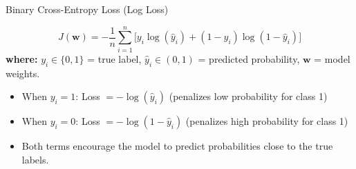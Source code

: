 \begin{frame}{Binary Cross-Entropy Loss (Log Loss)}
    \begin{tcolorbox}[colback=blue!5, colframe=blue!60, title=\textbf{Loss Function: Binary Cross-Entropy (Log Loss)}]
        $$ J(\mathbf{w}) = - \frac{1}{n}\sum_{i=1}^{n} \Big[y_i \log(\hat{y}_i) + (1-y_i)\log(1-\hat{y}_i)\Big] $$
        {\footnotesize
    \textbf{where:} $y_i\in\{0,1\}$ = true label,\; $\hat{y}_i\in(0,1)$ = predicted probability,\; $\mathbf{w}$ = model weights.}
    \end{tcolorbox}
    

    
    \vspace{1em}
    \begin{itemize}
        \item When $y_i = 1$: Loss $= -\log(\hat{y}_i)$ (penalizes low probability for class 1)
        \item When $y_i = 0$: Loss $= -\log(1-\hat{y}_i)$ (penalizes high probability for class 1)
        \item Both terms encourage the model to predict probabilities close to the true labels.
    \end{itemize}
\end{frame}

